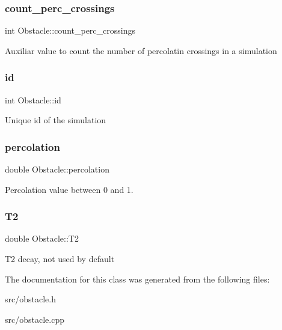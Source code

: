 \subsubsection{\texorpdfstring{count\+\_\+perc\+\_\+crossings}{count\_perc\_crossings}}
{\footnotesize\ttfamily int Obstacle\+::count\+\_\+perc\+\_\+crossings}

Auxiliar value to count the number of percolatin crossings in a simulation \mbox{\label{class_obstacle_a02e049a3395138a0dc6194af0112e2b0}} 
\subsubsection{\texorpdfstring{id}{id}}
{\footnotesize\ttfamily int Obstacle\+::id}

Unique id of the simulation \mbox{\label{class_obstacle_a7afe63ee05b482c526591c981b22cf54}} 
\subsubsection{\texorpdfstring{percolation}{percolation}}
{\footnotesize\ttfamily double Obstacle\+::percolation}

Percolation value between 0 and 1. \mbox{\label{class_obstacle_a374f9b4486f63abce9696f5fe3a13e8e}} 
\subsubsection{\texorpdfstring{T2}{T2}}
{\footnotesize\ttfamily double Obstacle\+::\+T2}

T2 decay, not used by default 

The documentation for this class was generated from the following files\+:\begin{DoxyCompactItemize}
\item 
src/obstacle.\+h\item 
src/obstacle.\+cpp\end{DoxyCompactItemize}
